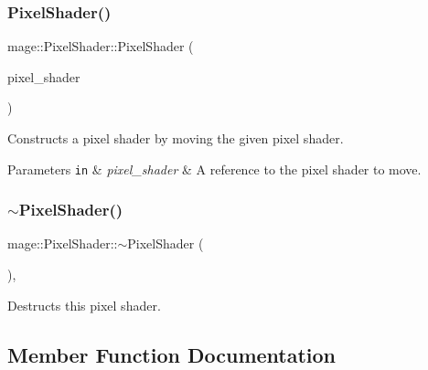\subsubsection{\texorpdfstring{Pixel\+Shader()}{PixelShader()}\hspace{0.1cm}{\footnotesize\ttfamily [4/4]}}
{\footnotesize\ttfamily mage\+::\+Pixel\+Shader\+::\+Pixel\+Shader (\begin{DoxyParamCaption}\item[{\hyperlink{classmage_1_1_pixel_shader}{Pixel\+Shader} \&\&}]{pixel\+\_\+shader }\end{DoxyParamCaption})\hspace{0.3cm}{\ttfamily [default]}}

Constructs a pixel shader by moving the given pixel shader.


\begin{DoxyParams}[1]{Parameters}
\mbox{\tt in}  & {\em pixel\+\_\+shader} & A reference to the pixel shader to move. \\
\hline
\end{DoxyParams}
\hypertarget{classmage_1_1_pixel_shader_aac21a59d5d614f5bf1905f01479de44e}{}\label{classmage_1_1_pixel_shader_aac21a59d5d614f5bf1905f01479de44e} 
\subsubsection{\texorpdfstring{$\sim$\+Pixel\+Shader()}{~PixelShader()}}
{\footnotesize\ttfamily mage\+::\+Pixel\+Shader\+::$\sim$\+Pixel\+Shader (\begin{DoxyParamCaption}{ }\end{DoxyParamCaption})\hspace{0.3cm}{\ttfamily [virtual]}, {\ttfamily [default]}}

Destructs this pixel shader. 

\subsection{Member Function Documentation}
\hypertarget{classmage_1_1_pixel_shader_ac3a3535b2751237f4aad110dca05d0c3}{}\label{classmage_1_1_pixel_shader_ac3a3535b2751237f4aad110dca05d0c3} 
